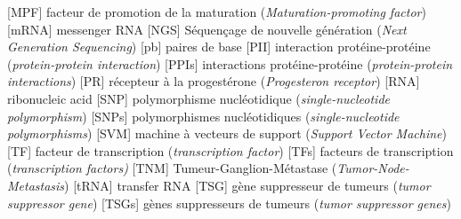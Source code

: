 \begin{acronym}[CDKN2A]
						[MPF]		{facteur de promotion de la maturation (\emph{Maturation-promoting factor})}
						[mRNA]		{messenger \ac{RNA}}
						[NGS]		{Séquençage de nouvelle génération (\emph{Next Generation Sequencing})}
						[pb]		{paires de base}
						[PII]		{interaction protéine-protéine (\emph{protein-protein interaction})}
					{interactions protéine-protéine (\emph{protein-protein interactions})}
						[PR]		{récepteur à la progestérone (\emph{Progesteron receptor})}
						[RNA]		{ribonucleic acid}
						[SNP]		{polymorphisme nucléotidique (\emph{single-nucleotide polymorphism})}
					{polymorphismes nucléotidiques (\emph{single-nucleotide polymorphisms})}
						[SVM]		{machine à vecteurs de support (\emph{Support Vector Machine})}
						[TF]		{facteur de transcription (\emph{transcription factor})}
					{facteurs de transcription (\emph{transcription factors)}}
						[TNM]		{Tumeur-Ganglion-Métastase (\emph{Tumor-Node-Metastasis})}
						[tRNA]		{transfer \ac{RNA}}
						[TSG]		{gène suppresseur de tumeurs (\emph{tumor suppressor gene})}
					{gènes suppresseurs de tumeurs (\emph{tumor suppressor genes})}
		\end{acronym}